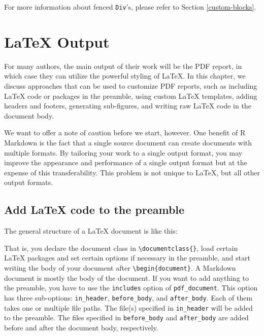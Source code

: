 \documentclass[
  11pt,
]{krantz}
\newenvironment{Shaded}{\begin{snugshade}}{\end{snugshade}}
\newcommand{\BuiltInTok}[1]{#1}
\newcommand{\CommentTok}[1]{\textcolor[rgb]{0.37,0.37,0.37}{\textit{#1}}}
\newcommand{\ExtensionTok}[1]{#1}
\newcommand{\KeywordTok}[1]{\textcolor[rgb]{0.27,0.27,0.27}{\textbf{#1}}}
\newcommand{\NormalTok}[1]{#1}
\begin{document}
For more information about fenced \texttt{Div}'s, please refer to Section \ref{custom-blocks}.

\hypertarget{latex-output}{%
\chapter{LaTeX Output}\label{latex-output}}

For many authors, the main output of their work will be the PDF report, in which case they can utilize the powerful styling of LaTeX. In this chapter, we discuss approaches that can be used to customize PDF reports, such as including LaTeX code or packages in the preamble, using custom LaTeX templates, adding headers and footers, generating sub-figures, and writing raw LaTeX code in the document body.

We want to offer a note of caution before we start, however. One benefit of R Markdown is the fact that a single source document can create documents with multiple formats. By tailoring your work to a single output format, you may improve the appearance and performance of a single output format but at the expense of this transferability. This problem is not unique to LaTeX, but all other output formats.

\hypertarget{latex-preamble}{%
\section{Add LaTeX code to the preamble}\label{latex-preamble}}

The general structure of a LaTeX document is like this:

\begin{Shaded}
\end{Shaded}

That is, you declare the document class in \texttt{\textbackslash{}documentclass\{\}}, load certain LaTeX packages and set certain options if necessary in the preamble, and start writing the body of your document after \texttt{\textbackslash{}begin\{document\}}. A Markdown document is mostly the body of the document. If you want to add anything to the preamble, you have to use the \texttt{includes} option of \texttt{pdf\_document}. This option has three sub-options: \texttt{in\_header}, \texttt{before\_body}, and \texttt{after\_body}. Each of them takes one or multiple file paths. The file(s) specified in \texttt{in\_header} will be added to the preamble. The files specified in \texttt{before\_body} and \texttt{after\_body} are added before and after the document body, respectively.
\end{document}
